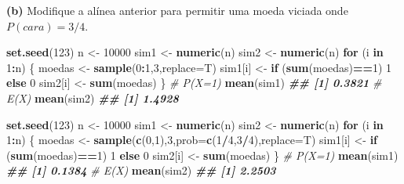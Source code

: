 \documentclass[
]{book}
\newenvironment{Shaded}{\begin{snugshade}}{\end{snugshade}}
\newcommand{\AttributeTok}[1]{\textcolor[rgb]{0.13,0.29,0.53}{#1}}
\newcommand{\CommentTok}[1]{\textcolor[rgb]{0.56,0.35,0.01}{\textit{#1}}}
\newcommand{\ControlFlowTok}[1]{\textcolor[rgb]{0.13,0.29,0.53}{\textbf{#1}}}
\newcommand{\DecValTok}[1]{\textcolor[rgb]{0.00,0.00,0.81}{#1}}
\newcommand{\DocumentationTok}[1]{\textcolor[rgb]{0.56,0.35,0.01}{\textbf{\textit{#1}}}}
\newcommand{\FunctionTok}[1]{\textcolor[rgb]{0.13,0.29,0.53}{\textbf{#1}}}
\newcommand{\NormalTok}[1]{#1}
\newcommand{\OtherTok}[1]{\textcolor[rgb]{0.56,0.35,0.01}{#1}}
\newcommand{\SpecialCharTok}[1]{\textcolor[rgb]{0.81,0.36,0.00}{\textbf{#1}}}
\begin{document}
\textbf{(b)} Modifique a alínea anterior para permitir uma moeda viciada onde
\(P(cara)=3/4\).

\begin{Shaded}
\begin{Highlighting}[]
\FunctionTok{set.seed}\NormalTok{(}\DecValTok{123}\NormalTok{)}
\NormalTok{n }\OtherTok{\textless{}{-}} \DecValTok{10000}
\NormalTok{sim1 }\OtherTok{\textless{}{-}} \FunctionTok{numeric}\NormalTok{(n)}
\NormalTok{sim2 }\OtherTok{\textless{}{-}} \FunctionTok{numeric}\NormalTok{(n)}
\ControlFlowTok{for}\NormalTok{ (i }\ControlFlowTok{in} \DecValTok{1}\SpecialCharTok{:}\NormalTok{n) \{}
\NormalTok{  moedas }\OtherTok{\textless{}{-}} \FunctionTok{sample}\NormalTok{(}\DecValTok{0}\SpecialCharTok{:}\DecValTok{1}\NormalTok{,}\DecValTok{3}\NormalTok{,}\AttributeTok{replace=}\NormalTok{T)}
\NormalTok{  sim1[i] }\OtherTok{\textless{}{-}} \ControlFlowTok{if}\NormalTok{ (}\FunctionTok{sum}\NormalTok{(moedas)}\SpecialCharTok{==}\DecValTok{1}\NormalTok{) }\DecValTok{1} \ControlFlowTok{else} \DecValTok{0}
\NormalTok{  sim2[i] }\OtherTok{\textless{}{-}} \FunctionTok{sum}\NormalTok{(moedas)}
\NormalTok{\}}
\CommentTok{\# P(X=1)}
\FunctionTok{mean}\NormalTok{(sim1)}
\DocumentationTok{\#\# [1] 0.3821}
\CommentTok{\# E(X)}
\FunctionTok{mean}\NormalTok{(sim2)}
\DocumentationTok{\#\# [1] 1.4928}
\end{Highlighting}
\end{Shaded}

\begin{Shaded}
\begin{Highlighting}[]
\FunctionTok{set.seed}\NormalTok{(}\DecValTok{123}\NormalTok{)}
\NormalTok{n }\OtherTok{\textless{}{-}} \DecValTok{10000}
\NormalTok{sim1 }\OtherTok{\textless{}{-}} \FunctionTok{numeric}\NormalTok{(n)}
\NormalTok{sim2 }\OtherTok{\textless{}{-}} \FunctionTok{numeric}\NormalTok{(n)}
\ControlFlowTok{for}\NormalTok{ (i }\ControlFlowTok{in} \DecValTok{1}\SpecialCharTok{:}\NormalTok{n) \{}
\NormalTok{  moedas }\OtherTok{\textless{}{-}} \FunctionTok{sample}\NormalTok{(}\FunctionTok{c}\NormalTok{(}\DecValTok{0}\NormalTok{,}\DecValTok{1}\NormalTok{),}\DecValTok{3}\NormalTok{,}\AttributeTok{prob=}\FunctionTok{c}\NormalTok{(}\DecValTok{1}\SpecialCharTok{/}\DecValTok{4}\NormalTok{,}\DecValTok{3}\SpecialCharTok{/}\DecValTok{4}\NormalTok{),}\AttributeTok{replace=}\NormalTok{T)}
\NormalTok{  sim1[i] }\OtherTok{\textless{}{-}} \ControlFlowTok{if}\NormalTok{ (}\FunctionTok{sum}\NormalTok{(moedas)}\SpecialCharTok{==}\DecValTok{1}\NormalTok{) }\DecValTok{1} \ControlFlowTok{else} \DecValTok{0}
\NormalTok{  sim2[i] }\OtherTok{\textless{}{-}} \FunctionTok{sum}\NormalTok{(moedas)}
\NormalTok{\}}
\CommentTok{\# P(X=1)}
\FunctionTok{mean}\NormalTok{(sim1)}
\DocumentationTok{\#\# [1] 0.1384}
\CommentTok{\# E(X)}
\FunctionTok{mean}\NormalTok{(sim2)}
\DocumentationTok{\#\# [1] 2.2503}
\end{Highlighting}
\end{Shaded}
\end{document}
